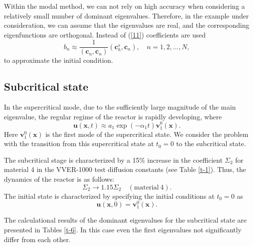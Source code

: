 \documentclass[a4paper]{jpconf}
\begin{document}
Within the modal method, we can not rely on high accuracy when considering a relatively small number of dominant eigenvalues. Therefore, in the example under consideration, we can assume that the eigenvalues are real, and the corresponding eigenfunctions are orthogonal. Instead of (\ref{11}) coefficients are used 
\begin{equation}\label{13}
 b_n \approx  \frac{1}{(\bm c_n, \bm c_n)} (\bm c_h^s, \bm c_n),
 \quad n = 1,2, ..., N ,
\end{equation}
to approximate the initial condition.

\subsection{Subcritical state} 

In the supercritical mode, due to the sufficiently large magnitude of the main eigenvalue, the regular regime of the reactor is rapidly developing, where 
\[
 \bm u (\bm x, t) \approx a_1 \exp(-\alpha_1 t) \bm v_1^0 (\bm x) .
\] 
Here  $\bm v_1^0 (\bm x)$ is the first mode of the supercritical state. We consider the problem with the transition from this supercritical state at  $t_0 = 0$  to the subcritical state.

The subcritical stage is characterized by a 15\% increase in the coefficient  
$\Sigma_2$ for material 4 in the VVER-1000 test diffusion constants (see Table  \ref{t-1}). 
Thus, the dynamics of the reactor is as follows: 
\[
 \Sigma_2 \longrightarrow 1.15 \Sigma_2 \quad (\mathrm{material} \ 4).
\] 
The initial state is characterized by specifying the initial conditions at $t_0 = 0$ as
\begin{equation}\label{14}
 \bm u (\bm x, 0) = \bm v_1^0 (\bm x) . 
\end{equation} 

The calculational results of  the dominant eigenvalues for the subcritical state are presented in Tables \ref{t-6}. In this case even the first eigenvalues not significantly differ from each other. 
\end{document}
